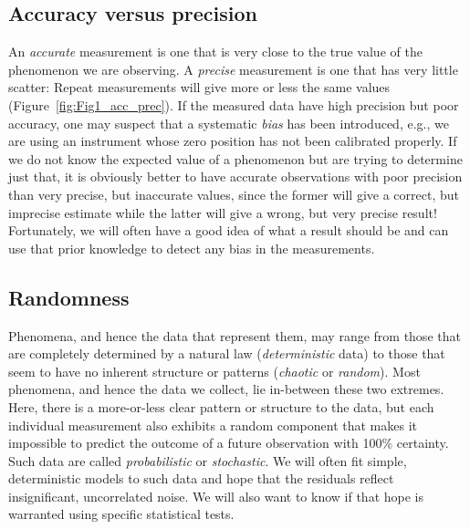 \subsection{Accuracy versus precision}
	An \emph{accurate} measurement is one that is very close to the true value of the phenomenon we 
are observing.  A \emph{precise} measurement is one that has very little scatter: Repeat measurements 
will give more or less the same values (Figure~\ref{fig:Fig1_acc_prec}).  If the measured data have high precision but poor accuracy, 
one may suspect that a systematic \emph{bias} has been introduced, e.g., we are using an instrument 
whose zero position has not been calibrated properly.  If we do not know the expected value of a 
phenomenon but are trying to determine just that, it is obviously better to have accurate 
observations with poor precision than very precise, but inaccurate values, since the former will 
give a correct, but imprecise estimate while the latter will give a wrong, but very precise result!
Fortunately, we will often have a good idea of what a result should be and can use that prior knowledge to
detect any bias in the measurements.

\subsection{Randomness}

Phenomena, and hence the data that represent them, may range from those that are completely determined
by a natural law (\emph{deterministic} data) to those that seem to have no inherent structure or patterns (\emph{chaotic} or \emph{random}).
Most phenomena, and hence the data we collect, lie in-between these two extremes.  Here, there is a more-or-less
clear pattern or structure
to the data, but each individual measurement also exhibits a random component that makes it impossible to
predict the outcome of a future observation with 100\% certainty.  Such data are called \emph{probabilistic} or
\emph{stochastic}.  We will often fit simple, deterministic models to such data and hope that the residuals
reflect insignificant, uncorrelated noise.  We will also want to know if that hope is warranted
using specific statistical tests.

